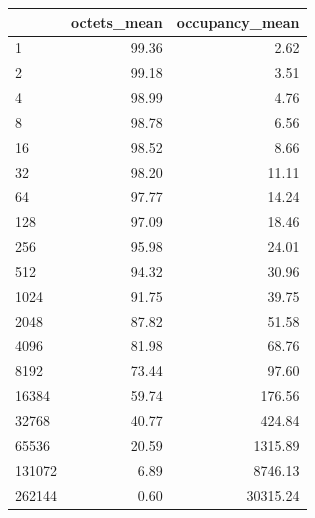 \begin{tabular}{lrr}
\toprule
 & octets_mean & occupancy_mean \\
\midrule
1 & 99.36 & 2.62 \\
2 & 99.18 & 3.51 \\
4 & 98.99 & 4.76 \\
8 & 98.78 & 6.56 \\
16 & 98.52 & 8.66 \\
32 & 98.20 & 11.11 \\
64 & 97.77 & 14.24 \\
128 & 97.09 & 18.46 \\
256 & 95.98 & 24.01 \\
512 & 94.32 & 30.96 \\
1024 & 91.75 & 39.75 \\
2048 & 87.82 & 51.58 \\
4096 & 81.98 & 68.76 \\
8192 & 73.44 & 97.60 \\
16384 & 59.74 & 176.56 \\
32768 & 40.77 & 424.84 \\
65536 & 20.59 & 1315.89 \\
131072 & 6.89 & 8746.13 \\
262144 & 0.60 & 30315.24 \\
\bottomrule
\end{tabular}

